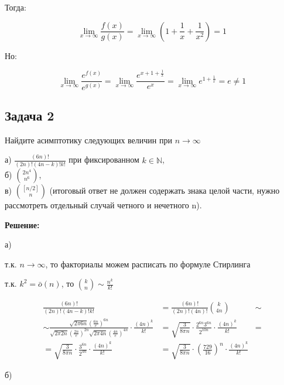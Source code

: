 \documentclass[a4paper, 11pt]{article}
\begin{document}
Тогда:

\begin{equation*}
\lim_{x \to \infty}\frac{f(x)}{g(x)}=\lim_{x \to \infty}\left(1+\frac{1}{x}+\frac{1}{x^2}\right)=1
\end{equation*}

Но:

\begin{equation*}
\lim_{x \to \infty}\frac{e^{f(x)}}{e^{g(x)}}=
	\lim_{x \to \infty}\frac{e^{x +1+\frac{1}{x}}}{e^x}=
	\lim_{x \to \infty}e^{1+\frac{1}{x}}=e\neq 1
\end{equation*}


\subsection{Задача 2}
Найдите асимптотику следующих величин при $n \to \infty$

\indent а) $\frac{(6n)!}{(2n)!(4n-k)!k!}$ при фиксированном $k \in \mathbb{N}$, 
\\

\indent б) $\binom{2n^4}{n^6}$,
\\

\indent в) $\binom{[n/2]}{n}$ (итоговый ответ не должен содержать знака целой части, нужно рассмотреть отдельный случай четного и нечетного n).

\textbf{Решение:}

а) 

т.к. $n \to \infty$, то факториалы можем расписать по формуле Стирлинга

т.к. $k^2 = \bar{o}(n)$, то $\binom{k}{n} \sim \frac{n^k}{k!}$

\begin{equation*}
\begin{aligned}
\frac{(6n)!}{(2n)!(4n-k)!k!}&=
\frac{(6n)!}{(2n)!(4n)!}\binom{k}{4n}&\sim
\\
\sim 
\frac
{
	\sqrt{2\pi 6n}{\left(\frac{6n}{e}\right)^{6n}}
}{
	\sqrt{2\pi 2n}{\left(\frac{2n}{e}\right)^{2n}}
	\sqrt{2\pi 4n}{\left(\frac{4n}{e}\right)^{4n}}
}\cdot \frac{(4n)^k}{k!}
&=
 \sqrt{\frac{3}{8\pi n}} \cdot \frac{
	2^{6n}3^{6n}
}{
2^{10n}
}\cdot \frac{(4n)^k}{k!} 
&=
\\
= 
\sqrt{\frac{3}{8\pi n}} \cdot \frac{
	3^{6n}
}{
	2^{4n}
}\cdot \frac{(4n)^k}{k!} 
&=
 \sqrt{\frac{3}{8\pi n}} \cdot \left(\frac{729}{16}\right)^n\cdot \frac{(4n)^k}{k!}
\end{aligned}
\end{equation*}

б)
\end{document}
